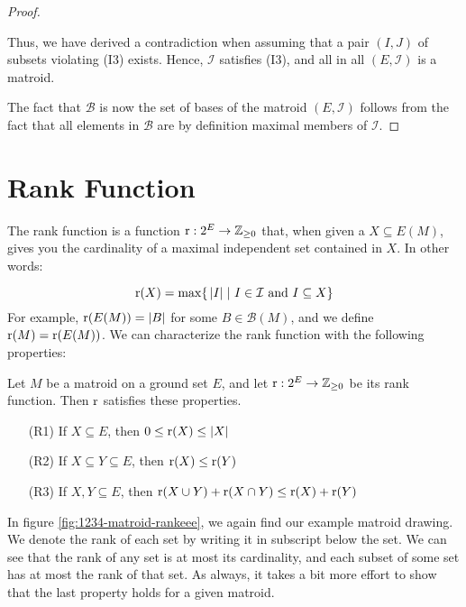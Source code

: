 \begin{proof}
\begin{enumerate}
        Thus, we have derived a contradiction when assuming that a pair $(I, J)$ of subsets violating (I3) exists. Hence, $\mathcal{I}$ satisfies (I3), and all in all $(E,\mathcal{I})$ is a matroid.
    \end{enumerate}  

    
    The fact that $\mathcal{B}$ is now the set of bases of the matroid $(E,\mathcal{I})$ follows from the fact that all elements in $\mathcal{B}$ are by definition maximal members of $\mathcal{I}$.
\end{proof}

\newpage



\newpage
\section{Rank Function}

The rank function is a function $\operatorname{r} :2^E \rightarrow \mathbb{Z}_{\geq0}$ that, when given a $X\subseteq E(M)$, gives you the cardinality of a maximal independent set contained in $X$. In other words:

$$ \operatorname{r}(X) = \max\{\, |I| \; | \,\, I\in\mathcal{I} \text{ and } I\subseteq X \} $$
For example, $\operatorname{r}(E(M))=|B|$ for some $B\in\mathcal{B}(M)$, and we define $\operatorname{r}(M) = \operatorname{r}(E(M))$. We can characterize the rank function with the following properties:

\begin{theorem}
    Let $M$ be a matroid on a ground set $E$, and let $\operatorname{r} : 2^E \rightarrow \mathbb{Z}_{\geq0}$ be its rank function. Then $\operatorname{r}$ satisfies these properties.
    \begin{enumerate}
        \item[(R1)] If $X\subseteq E$, then $0 \leq \operatorname{r}(X) \leq |X| $
        \item[(R2)] If $X\subseteq Y\subseteq E$, then $\operatorname{r}(X)\leq\operatorname{r}(Y)$
        \item[(R3)] If $X,Y\subseteq E$, then $\operatorname{r}(X\cup Y)+\operatorname{r}(X\cap Y) \leq \operatorname{r}(X)+\operatorname{r}(Y) $
    \end{enumerate}
\end{theorem}

In figure \ref{fig:1234-matroid-rankeee}, we again find our example matroid drawing. We denote the rank of each set by writing it in subscript below the set. We can see that the rank of any set is at most its cardinality, and each subset of some set has at most the rank of that set. As always, it takes a bit more effort to show that the last property holds for a given matroid.


